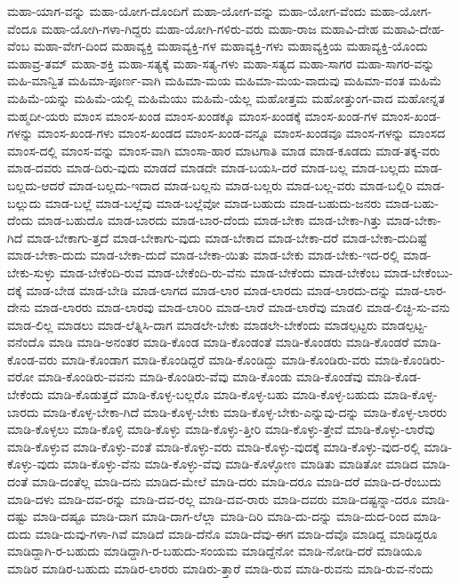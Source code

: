 {ಮಹಾ-ಯಾಗ-ವನ್ನು
ಮಹಾ-ಯೋಗ-ದೊಂದಿಗೆ
ಮಹಾ-ಯೋಗ-ವನ್ನು
ಮಹಾ-ಯೋಗ-ವೆಂದು
ಮಹಾ-ಯೋಗ-ವೆಂದೂ
ಮಹಾ-ಯೋಗಿ-ಗಳಾ-ಗಿದ್ದರು
ಮಹಾ-ಯೋಗಿ-ಗಳಿರು-ವರು
ಮಹಾ-ರಾಜ
ಮಹಾವಿ-ದೇಹ
ಮಹಾವಿ-ದೇಹ-ವೆಂಬ
ಮಹಾ-ವೇಗ-ದಿಂದ
ಮಹಾವ್ಯಕ್ತಿ
ಮಹಾವ್ಯಕ್ತಿ-ಗಳ
ಮಹಾವ್ಯಕ್ತಿ-ಗಳು
ಮಹಾವ್ಯಕ್ತಿಯ
ಮಹಾವ್ಯಕ್ತಿ-ಯೊಂದು
ಮಹಾವ್ರ-ತಮ್
ಮಹಾ-ಶಕ್ತಿ
ಮಹಾ-ಸತ್ಯಕ್ಕೆ
ಮಹಾ-ಸತ್ಯ-ಗಳು
ಮಹಾ-ಸತ್ಯದ
ಮಹಾ-ಸಾಗರ
ಮಹಾ-ಸಾಗರ-ವನ್ನು
ಮಹಿ-ಮಾನ್ವಿತ
ಮಹಿಮಾ-ಪೂರ್ಣ-ವಾಗಿ
ಮಹಿಮಾ-ಮಯ
ಮಹಿಮಾ-ಮಯ-ವಾದುವು
ಮಹಿಮಾ-ವಂತ
ಮಹಿಮೆ
ಮಹಿಮೆ-ಯನ್ನು
ಮಹಿಮೆ-ಯಲ್ಲಿ
ಮಹಿಮೆಯು
ಮಹಿಮೆ-ಯೆಲ್ಲ
ಮಹೋತ್ತಮ
ಮಹೋತ್ತುಂಗ-ವಾದ
ಮಹೋನ್ನತ
ಮಹ್ಮದೀ-ಯರು
ಮಾಂಸ
ಮಾಂಸ-ಖಂಡ
ಮಾಂಸ-ಖಂಡಕ್ಕೂ
ಮಾಂಸ-ಖಂಡಕ್ಕೆ
ಮಾಂಸ-ಖಂಡ-ಗಳ
ಮಾಂಸ-ಖಂಡ-ಗಳನ್ನು
ಮಾಂಸ-ಖಂಡ-ಗಳು
ಮಾಂಸ-ಖಂಡದ
ಮಾಂಸ-ಖಂಡ-ವನ್ನೂ
ಮಾಂಸ-ಖಂಡವೂ
ಮಾಂಸ-ಗಳನ್ನು
ಮಾಂಸದ
ಮಾಂಸ-ದಲ್ಲಿ
ಮಾಂಸ-ವನ್ನು
ಮಾಂಸ-ವಾಗಿ
ಮಾಂಸಾ-ಹಾರ
ಮಾಟಗಾತಿ
ಮಾಡ
ಮಾಡ-ಕೂಡದು
ಮಾಡ-ತಕ್ಕ-ವರು
ಮಾಡ-ದವರು
ಮಾಡ-ದಿರು-ವುದು
ಮಾಡದೆ
ಮಾಡದೇ
ಮಾಡ-ಬಯಸಿ-ದರೆ
ಮಾಡ-ಬಲ್ಲ
ಮಾಡ-ಬಲ್ಲದು
ಮಾಡ-ಬಲ್ಲದು-ಆದರೆ
ಮಾಡ-ಬಲ್ಲದು-ಇದಾದ
ಮಾಡ-ಬಲ್ಲನು
ಮಾಡ-ಬಲ್ಲರು
ಮಾಡ-ಬಲ್ಲ-ವರು
ಮಾಡ-ಬಲ್ಲಿರಿ
ಮಾಡ-ಬಲ್ಲುದು
ಮಾಡ-ಬಲ್ಲೆ
ಮಾಡ-ಬಲ್ಲೆವು
ಮಾಡ-ಬಲ್ಲೆವೋ
ಮಾಡ-ಬಹುದು
ಮಾಡ-ಬಹುದು-ಜನರು
ಮಾಡ-ಬಹು-ದೆಂದು
ಮಾಡ-ಬಹುದೊ
ಮಾಡ-ಬಾರದು
ಮಾಡ-ಬಾರ-ದೆಂದು
ಮಾಡ-ಬೇಕಾ
ಮಾಡ-ಬೇಕಾ-ಗಿತ್ತು
ಮಾಡ-ಬೇಕಾ-ಗಿದೆ
ಮಾಡ-ಬೇಕಾಗು-ತ್ತದೆ
ಮಾಡ-ಬೇಕಾಗು-ವುದು
ಮಾಡ-ಬೇಕಾದ
ಮಾಡ-ಬೇಕಾ-ದರೆ
ಮಾಡ-ಬೇಕಾ-ದುದಿಷ್ಟೆ
ಮಾಡ-ಬೇಕಾ-ದುದು
ಮಾಡ-ಬೇಕಾ-ದುದೆ
ಮಾಡ-ಬೇಕಾ-ಯಿತು
ಮಾಡ-ಬೇಕು
ಮಾಡ-ಬೇಕು-ಇದ-ರಲ್ಲಿ
ಮಾಡ-ಬೇಕು-ಸುಳ್ಳು
ಮಾಡ-ಬೇಕೆಂದಿ-ರುವ
ಮಾಡ-ಬೇಕೆಂದಿ-ರು-ವೆನು
ಮಾಡ-ಬೇಕೆಂದು
ಮಾಡ-ಬೇಕೆಂಬ
ಮಾಡ-ಬೇಕೆಂಬು-ದಕ್ಕೆ
ಮಾಡ-ಬೇಡ
ಮಾಡ-ಬೇಡಿ
ಮಾಡ-ಲಾಗದ
ಮಾಡ-ಲಾರ
ಮಾಡ-ಲಾರದು
ಮಾಡ-ಲಾರದು-ದನ್ನು
ಮಾಡ-ಲಾರ-ದೇನು
ಮಾಡ-ಲಾರರು
ಮಾಡ-ಲಾರವು
ಮಾಡ-ಲಾರಿರಿ
ಮಾಡ-ಲಾರೆ
ಮಾಡ-ಲಾರೆವು
ಮಾಡಲಿ
ಮಾಡ-ಲಿಚ್ಛಿ-ಸು-ವನು
ಮಾಡ-ಲಿಲ್ಲ
ಮಾಡಲು
ಮಾಡ-ಲೆತ್ನಿಸಿ-ದಾಗ
ಮಾಡಲೇ-ಬೇಕು
ಮಾಡಲೇ-ಬೇಕೆಂದು
ಮಾಡಲ್ಪಟ್ಟರು
ಮಾಡಲ್ಪಟ್ಟ-ವನೆಂದೊ
ಮಾಡಿ
ಮಾಡಿ-ಅನಂತರ
ಮಾಡಿ-ಕೊಂಡ
ಮಾಡಿ-ಕೊಂಡಂತೆ
ಮಾಡಿ-ಕೊಂಡರು
ಮಾಡಿ-ಕೊಂಡರೆ
ಮಾಡಿ-ಕೊಂಡ-ವರು
ಮಾಡಿ-ಕೊಂಡಾಗ
ಮಾಡಿ-ಕೊಂಡಿದ್ದರೆ
ಮಾಡಿ-ಕೊಂಡಿದ್ದು
ಮಾಡಿ-ಕೊಂಡಿರು-ವರು
ಮಾಡಿ-ಕೊಂಡಿರು-ವರೋ
ಮಾಡಿ-ಕೊಂಡಿರು-ವವನು
ಮಾಡಿ-ಕೊಂಡಿರು-ವೆವು
ಮಾಡಿ-ಕೊಂಡು
ಮಾಡಿ-ಕೊಂಡೆವು
ಮಾಡಿ-ಕೊಡ-ಬೇಕೆಂದು
ಮಾಡಿ-ಕೊಡುತ್ತದೆ
ಮಾಡಿ-ಕೊಳ್ಳ-ಬಲ್ಲರೊ
ಮಾಡಿ-ಕೊಳ್ಳ-ಬಹು
ಮಾಡಿ-ಕೊಳ್ಳ-ಬಹುದು
ಮಾಡಿ-ಕೊಳ್ಳ-ಬಾರದು
ಮಾಡಿ-ಕೊಳ್ಳ-ಬೇಕಾ-ಗಿದೆ
ಮಾಡಿ-ಕೊಳ್ಳ-ಬೇಕು
ಮಾಡಿ-ಕೊಳ್ಳ-ಬೇಕು-ಎನ್ನುವು-ದನ್ನು
ಮಾಡಿ-ಕೊಳ್ಳ-ಲಾರರು
ಮಾಡಿ-ಕೊಳ್ಳಲು
ಮಾಡಿ-ಕೊಳ್ಳಿ
ಮಾಡಿ-ಕೊಳ್ಳು
ಮಾಡಿ-ಕೊಳ್ಳು-ತ್ತೀರಿ
ಮಾಡಿ-ಕೊಳ್ಳು-ತ್ತೇವೆ
ಮಾಡಿ-ಕೊಳ್ಳು-ಲಾರೆವು
ಮಾಡಿ-ಕೊಳ್ಳುವ
ಮಾಡಿ-ಕೊಳ್ಳು-ವಂತೆ
ಮಾಡಿ-ಕೊಳ್ಳು-ವರು
ಮಾಡಿ-ಕೊಳ್ಳು-ವುದಕ್ಕೆ
ಮಾಡಿ-ಕೊಳ್ಳು-ವುದ-ರಲ್ಲಿ
ಮಾಡಿ-ಕೊಳ್ಳು-ವುದು
ಮಾಡಿ-ಕೊಳ್ಳು-ವೆನು
ಮಾಡಿ-ಕೊಳ್ಳು-ವೆವು
ಮಾಡಿ-ಕೊಳ್ಳೋಣ
ಮಾಡಿತು
ಮಾಡಿತೋ
ಮಾಡಿದ
ಮಾಡಿ-ದಂತೆ
ಮಾಡಿ-ದಂತೆಲ್ಲ
ಮಾಡಿ-ದನು
ಮಾಡಿದ-ಮೇಲೆ
ಮಾಡಿ-ದರು
ಮಾಡಿ-ದರೂ
ಮಾಡಿ-ದರೆ
ಮಾಡಿ-ದ-ರೆಂಬುದು
ಮಾಡಿ-ದಳು
ಮಾಡಿ-ದವ-ರನ್ನು
ಮಾಡಿ-ದವ-ರಲ್ಲ
ಮಾಡಿ-ದವ-ರಾರು
ಮಾಡಿ-ದವರು
ಮಾಡಿ-ದಷ್ಟನ್ನಾ-ದರೂ
ಮಾಡಿ-ದಷ್ಟು
ಮಾಡಿ-ದಷ್ಟೂ
ಮಾಡಿ-ದಾಗ
ಮಾಡಿ-ದಾಗ-ಲೆಲ್ಲಾ
ಮಾಡಿ-ದಿರಿ
ಮಾಡಿ-ದು-ದನ್ನು
ಮಾಡಿ-ದುದ-ರಿಂದ
ಮಾಡಿ-ದುದು
ಮಾಡಿ-ದುವು-ಗಳಾ-ಗಿವೆ
ಮಾಡಿದೆ
ಮಾಡಿ-ದೆನೊ
ಮಾಡಿ-ದೆವು-ಈಗ
ಮಾಡಿ-ದೆವೊ
ಮಾಡಿದ್ದ
ಮಾಡಿದ್ದರೂ
ಮಾಡಿದ್ದಾಗಿ-ರ-ಬಹುದು
ಮಾಡಿದ್ದಾಗಿ-ರ-ಬಹುದು-ಸಂಯಮ
ಮಾಡಿದ್ದೆನೋ
ಮಾಡಿ-ನೋಡಿ-ದರೆ
ಮಾಡಿಯೂ
ಮಾಡಿರ
ಮಾಡಿರ-ಬಹುದು
ಮಾಡಿರ-ಲಾರರು
ಮಾಡಿರು-ತ್ತಾರೆ
ಮಾಡಿ-ರುವ
ಮಾಡಿ-ರುವನು
ಮಾಡಿ-ರುವ-ನೆಂದು
}
